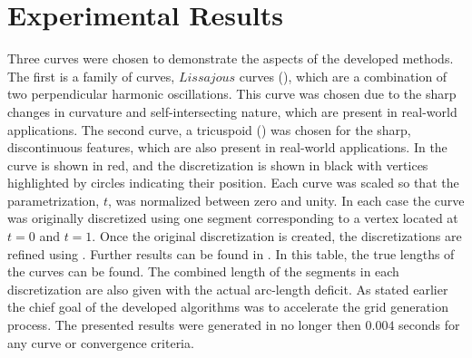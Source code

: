 \section{Experimental Results}
Three curves were chosen to demonstrate the aspects of the developed 
methods. The first is a family of curves, $Lissajous$ curves 
(), which are a combination of two perpendicular 
harmonic oscillations. This curve was chosen due to the sharp changes in 
curvature and self-intersecting nature, which are present in real-world 
applications. The second curve, a tricuspoid 
() was chosen for the sharp, discontinuous features, 
which are also present in real-world applications. 
In  the curve is shown in red, and the discretization is shown in black with vertices highlighted by circles indicating their position. Each curve was scaled so that the parametrization, $t$, was normalized between zero and unity. In each case the curve was originally discretized using one segment corresponding to a vertex located at $t=0$ and $t=1$. Once the original discretization is created, the discretizations are refined using . Further results can be found in . In this table, the true lengths of the curves can be found. The combined length of the segments in each discretization are also given with the actual arc-length deficit. As stated earlier the chief goal of the developed algorithms was to accelerate the grid generation process. The presented results were generated in no longer then $0.004$ seconds for any curve or convergence criteria.

